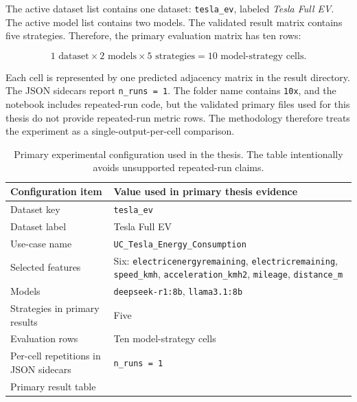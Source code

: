 The active dataset list contains one dataset:
\texttt{tesla\_ev}, labeled \emph{Tesla Full EV}. The active model list
contains two models. The validated result matrix contains five strategies.
Therefore, the primary evaluation matrix has ten rows:

\begin{equation}
  1 \text{ dataset} \times 2 \text{ models} \times 5 \text{ strategies}
  = 10 \text{ model-strategy cells}.
\end{equation}

Each cell is represented by one predicted adjacency matrix in the result
directory. The JSON sidecars report \texttt{n\_runs = 1}. The folder name
contains \texttt{10x}, and the notebook includes repeated-run code, but the
validated primary files used for this thesis do not provide repeated-run
metric rows. The methodology therefore treats the experiment as a
single-output-per-cell comparison.

\begin{table}[!htbp]
  \centering
  \small
  \setlength{\tabcolsep}{3pt}
  \begin{tabularx}{\textwidth}{@{}L{45mm}Y@{}}
    \toprule
    Configuration item & Value used in primary thesis evidence \\
    \midrule
    Dataset key & \texttt{tesla\_ev} \\
    Dataset label & Tesla Full EV \\
    Use-case name & \texttt{UC\_Tesla\_Energy\_Consumption} \\
    Selected features & Six: \texttt{electricenergyremaining}, \texttt{electricremaining}, \texttt{speed\_kmh}, \texttt{acceleration\_kmh2}, \texttt{mileage}, \texttt{distance\_m} \\
    Models & \texttt{deepseek-r1:8b}, \texttt{llama3.1:8b} \\
    Strategies in primary results & Five \\
    Evaluation rows & Ten model-strategy cells \\
    Per-cell repetitions in JSON sidecars & \texttt{n\_runs = 1} \\
    Primary result table &  \\
    \bottomrule
  \end{tabularx}
  \caption{Primary experimental configuration used in the thesis. The table intentionally avoids unsupported repeated-run claims.}
  \label{tab:primary-experiment-config}
\end{table}

